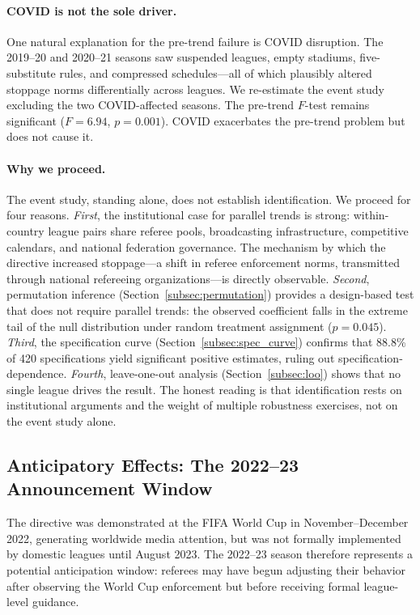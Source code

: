 \paragraph{COVID is not the sole driver.} One natural explanation for the pre-trend failure is COVID disruption. The 2019--20 and 2020--21 seasons saw suspended leagues, empty stadiums, five-substitute rules, and compressed schedules---all of which plausibly altered stoppage norms differentially across leagues. We re-estimate the event study excluding the two COVID-affected seasons. The pre-trend $F$-test remains significant ($F = 6.94$, $p = 0.001$). COVID exacerbates the pre-trend problem but does not cause it.

\paragraph{Why we proceed.} The event study, standing alone, does not establish identification. We proceed for four reasons. \textit{First}, the institutional case for parallel trends is strong: within-country league pairs share referee pools, broadcasting infrastructure, competitive calendars, and national federation governance. The mechanism by which the directive increased stoppage---a shift in referee enforcement norms, transmitted through national refereeing organizations---is directly observable. \textit{Second}, permutation inference (Section~\ref{subsec:permutation}) provides a design-based test that does not require parallel trends: the observed coefficient falls in the extreme tail of the null distribution under random treatment assignment ($p = 0.045$). \textit{Third}, the specification curve (Section~\ref{subsec:spec_curve}) confirms that 88.8\% of 420 specifications yield significant positive estimates, ruling out specification-dependence. \textit{Fourth}, leave-one-out analysis (Section~\ref{subsec:loo}) shows that no single league drives the result. The honest reading is that identification rests on institutional arguments and the weight of multiple robustness exercises, not on the event study alone.


\subsection{Anticipatory Effects: The 2022--23 Announcement Window}
\label{subsec:anticipation}

The directive was demonstrated at the FIFA World Cup in November--December 2022, generating worldwide media attention, but was not formally implemented by domestic leagues until August 2023. The 2022--23 season therefore represents a potential anticipation window: referees may have begun adjusting their behavior after observing the World Cup enforcement but before receiving formal league-level guidance.

